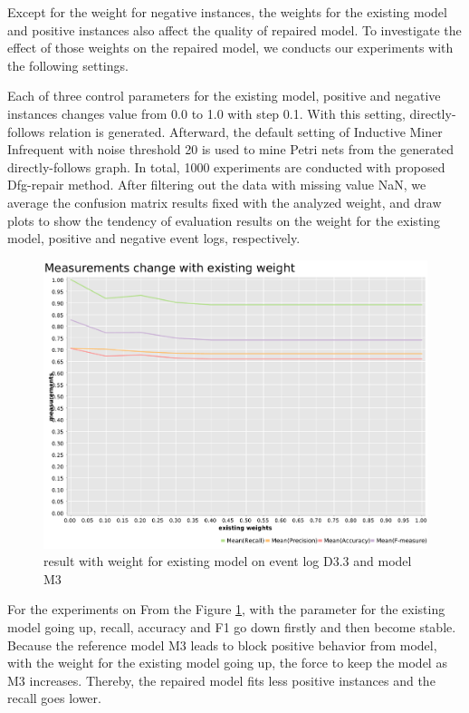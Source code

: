Except for the weight for negative instances, the weights for the existing model and positive instances also affect the quality of repaired model. To investigate the effect of those weights on the repaired model, we conducts our experiments with the following settings.


Each of three control parameters for the existing model, positive and negative instances changes value from 0.0 to 1.0 with step 0.1. With this setting, directly-follows relation is generated. Afterward, the default setting of Inductive Miner Infrequent with noise threshold 20 is used to mine Petri nets from the generated directly-follows graph. In total, 1000 experiments are conducted with proposed Dfg-repair method. 
After filtering out the data with missing value NaN, we average the confusion matrix results fixed with the analyzed weight,  and draw plots to show the tendency of evaluation results on the weight for the existing model, positive and negative event logs, respectively. 

\begin{figure}[htb]
	\includegraphics[width=\linewidth]{figures/evaluation/M3-D43-ext-weight-plot.pdf}
	\caption{result with weight for existing model on event log D3.3 and model M3}
	\label{fig:ext-weight}
\end{figure} 
For the experiments on From the Figure \ref{fig:ext-weight}, with the parameter for the existing model going up, recall, accuracy and F1 go down firstly and then become stable. Because the reference model M3 leads to block positive behavior from model, with the weight for the existing model going up, the force to keep the model as M3 increases. Thereby, the repaired model fits less positive instances and the recall goes lower. 

